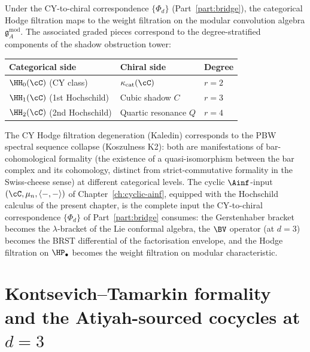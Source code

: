 \begin{remark}
\label{rem:hodge-shadow-bridge}
Under the CY-to-chiral correspondence $\{\Phi_d\}$ (Part~\ref{part:bridge}), the categorical
Hodge filtration maps to the weight filtration on the modular
convolution algebra $\mathfrak{g}^{\mathrm{mod}}_A$. The
associated graded pieces correspond to the degree-stratified
components of the shadow obstruction tower:
\begin{center}
\begin{tabular}{lll}
\toprule
Categorical side & Chiral side & Degree \\
\midrule
$\HH_0(\cC)$ (CY class) & $\kappa_{\mathrm{cat}}(\cC)$ & $r = 2$ \\
$\HH_1(\cC)$ (1st Hochschild) & Cubic shadow $C$ & $r = 3$ \\
$\HH_2(\cC)$ (2nd Hochschild) & Quartic resonance $Q$ & $r = 4$ \\
\bottomrule
\end{tabular}
\end{center}
\noindent The CY Hodge filtration degeneration (Kaledin)
corresponds to the PBW spectral sequence collapse
(Koszulness K2): both are manifestations of bar-cohomological formality (the existence of a quasi-isomorphism between the bar complex and its cohomology, distinct from strict-commutative formality in the Swiss-cheese sense) at different categorical levels. The cyclic $\Ainf$-input $(\cC, \mu_n, \langle-,-\rangle)$ of Chapter~\ref{ch:cyclic-ainf}, equipped with the Hochschild calculus of the present chapter, is the complete input the CY-to-chiral correspondence $\{\Phi_d\}$ of Part~\ref{part:bridge} consumes: the Gerstenhaber bracket becomes the $\lambda$-bracket of the Lie conformal algebra, the $\BV$ operator (at $d=3$) becomes the BRST differential of the factorisation envelope, and the Hodge filtration on $\HP_\bullet$ becomes the weight filtration on modular characteristic.
\end{remark}


\section{Kontsevich--Tamarkin formality and the Atiyah-sourced cocycles at \texorpdfstring{$d=3$}{d=3}}
\label{sec:kt-formality-atiyah-cocycles}

